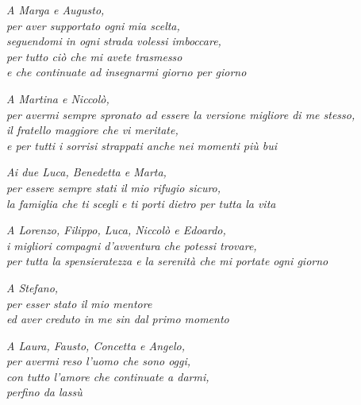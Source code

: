 \thispagestyle{empty}

{\selectfont

    \begin{flushright}
    
    \textit{A Marga e Augusto,
    \\ per aver supportato ogni mia scelta,
    \\ seguendomi in ogni strada volessi imboccare,
    \\ per tutto ciò che mi avete trasmesso
    \\ e che continuate ad insegnarmi giorno per giorno}
    
    \vspace{0.7cm}
    
    \textit{A Martina e Niccolò,
    \\ per avermi sempre spronato ad essere la versione migliore di me stesso,
    \\ il fratello maggiore che vi meritate,
    \\ e per tutti i sorrisi strappati anche nei momenti più bui}
    
    \vspace{0.7cm}
    
    \textit{Ai due Luca, Benedetta e Marta,
    \\ per essere sempre stati il mio rifugio sicuro,
    \\ la famiglia che ti scegli e ti porti dietro per tutta la vita}
    
    \vspace{0.7cm}
    
    \textit{A Lorenzo, Filippo, Luca, Niccolò e Edoardo,
    \\ i migliori compagni d'avventura che potessi trovare,
    \\ per tutta la spensieratezza e la serenità che mi portate ogni giorno}
    
    \vspace{0.7cm}
    
    \textit{A Stefano,
    \\ per esser stato il mio mentore
    \\ ed aver creduto in me sin dal primo momento}
    
    \vspace{0.7cm}
    
    \textit{A Laura, Fausto, Concetta e Angelo,
    \\ per avermi reso l'uomo che sono oggi,
    \\ con tutto l'amore che continuate a darmi,
    \\ perfino da lassù}
    
    \end{flushright}
}


